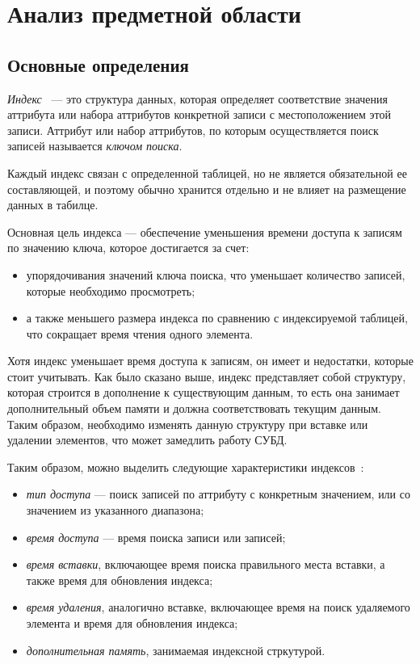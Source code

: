 \chapter{Анализ предметной области}

\section{Основные определения}

\textit{Индекс}~\cite{} --- это структура данных, которая определяет соответствие
значения аттрибута или набора аттрибутов конкретной записи с местоположением
этой записи.  Аттрибут или набор аттрибутов, по которым осуществляется поиск
записей называется \textit{ключом поиска}.

Каждый индекс связан с определенной таблицей, но не является обязательной ее
составляющей, и поэтому обычно хранится отдельно и не влияет на размещение
данных в табилце.

Основная цель индекса --- обеспечение уменьшения времени доступа к записям по
значению ключа, которое достигается за счет:

\begin{itemize}
    \item упорядочивания значений ключа поиска, что уменьшает количество
        записей, которые необходимо просмотреть;
    \item а также меньшего размера индекса по сравнению с индексируемой
        таблицей, что сокращает время чтения одного элемента.
\end{itemize}

Хотя индекс уменьшает время доступа к записям, он имеет и недостатки, которые
стоит учитывать. Как было сказано выше, индекс представляет собой структуру,
которая строится в дополнение к существующим данным, то есть она занимает
дополнительный объем памяти и должна соответствовать текущим данным. Таким
образом, необходимо изменять данную структуру при вставке или удалении
элементов, что может замедлить работу СУБД.

Таким образом, можно выделить следующие характеристики индексов~\cite{}:

\begin{itemize}
    \item \textit{тип доступа} --- поиск записей по аттрибуту с конкретным
        значением, или со значением из указанного диапазона;
    \item \textit{время доступа} --- время поиска записи или записей;
    \item \textit{время вставки}, включающее время поиска правильного места вставки, а
        также время для обновления индекса;
    \item \textit{время удаления}, аналогично вставке, включающее время на поиск
        удаляемого элемента и время для обновления индекса;
    \item \textit{дополнительная память}, занимаемая индексной стркутурой.
\end{itemize}

